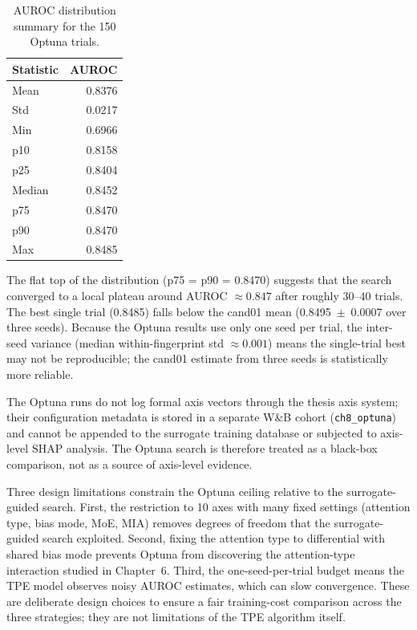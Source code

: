 \begin{table}[h]
  \centering\small
  \caption{AUROC distribution summary for the 150 Optuna trials.}
  \label{tab:ch8_optuna}
  \begin{tabular}{lr}
    \toprule
    Statistic & AUROC \\
    \midrule
    Mean   & 0.8376 \\
    Std    & 0.0217 \\
    Min    & 0.6966 \\
    p10    & 0.8158 \\
    p25    & 0.8404 \\
    Median & 0.8452 \\
    p75    & 0.8470 \\
    p90    & 0.8470 \\
    Max    & 0.8485 \\
    \bottomrule
  \end{tabular}
\end{table}

The flat top of the distribution (p75 = p90 = 0.8470) suggests that the search
converged to a local plateau around AUROC $\approx 0.847$ after roughly 30--40
trials. The best single trial (0.8485) falls below the cand01 mean
(0.8495~$\pm$~0.0007 over three seeds). Because the Optuna results use only one
seed per trial, the inter-seed variance (median within-fingerprint std
$\approx 0.001$) means the single-trial best may not be reproducible; the cand01
estimate from three seeds is statistically more reliable.

The Optuna runs do not log formal axis vectors through the thesis axis system;
their configuration metadata is stored in a separate W\&B cohort
(\texttt{ch8\_optuna}) and cannot be appended to the surrogate training database
or subjected to axis-level SHAP analysis. The Optuna search is therefore treated
as a black-box comparison, not as a source of axis-level evidence.

Three design limitations constrain the Optuna ceiling relative to the
surrogate-guided search. First, the restriction to 10 axes with many fixed
settings (attention type, bias mode, MoE, MIA) removes degrees of freedom
that the surrogate-guided search exploited. Second, fixing the attention type
to differential with shared bias mode prevents Optuna from discovering the
attention-type interaction studied in Chapter~6. Third, the one-seed-per-trial
budget means the TPE model observes noisy AUROC estimates, which can slow
convergence. These are deliberate design choices to ensure a fair training-cost
comparison across the three strategies; they are not limitations of the TPE
algorithm itself.

